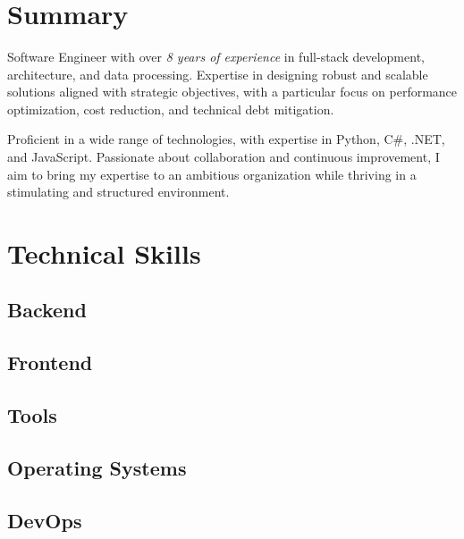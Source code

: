 \documentclass[11pt,a4paper,sans]{moderncv}
\title{\textnormal{\textls[150]{Software Architect}}}
\begin{document}
\makecvtitle

\section{Summary}
Software Engineer with over \textit{8 years of experience} in full-stack development, architecture, and data processing. Expertise in designing robust and scalable solutions aligned with strategic objectives, with a particular focus on performance optimization, cost reduction, and technical debt mitigation.

\vspace{0.1cm}

Proficient in a wide range of technologies, with expertise in Python, C\#, .NET, and JavaScript. Passionate about collaboration and continuous improvement, I aim to bring my expertise to an ambitious organization while thriving in a stimulating and structured environment.

\section{Technical Skills}
\subsection{Backend}

\subsection{Frontend}

\subsection{Tools}

\subsection{Operating Systems}

\subsection{DevOps}
\end{document}
